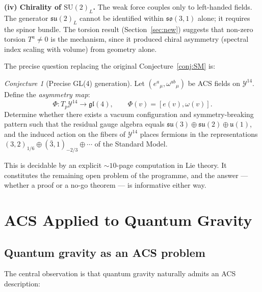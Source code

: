 \documentclass[12pt,a4paper]{article}
\theoremstyle{plain}
\theoremstyle{definition}
\theoremstyle{remark}
\newtheorem{conjecture}[theorem]{Conjecture}
\begin{document}
\medskip
\noindent\textbf{(iv) Chirality of $\mathrm{SU}(2)_L$.}  
The weak force couples only to left-handed fields.  
The generator $\mathfrak{su}(2)_L$ cannot be identified within $\mathfrak{so}(3,1)$ 
alone; it requires the spinor bundle.  
The torsion result (Section~\ref{sec:new}) suggests that 
non-zero torsion $T^a \neq 0$ is the mechanism, 
since it produced chiral asymmetry (spectral index scaling with volume) 
from geometry alone.

\medskip

The precise question replacing the original Conjecture~\ref{conj:SM} is:

\begin{conjecture}[Precise GL(4) generation]\label{conj:gl4-precise}
Let $(e^a{}_\mu, \omega^{ab}{}_\mu)$ be ACS fields on $\mathcal{Y}^{14}$.  
Define the \emph{asymmetry map}:
\[
  \Phi: T_p\mathcal{Y}^{14} \to \mathfrak{gl}(4), \qquad
  \Phi(v) = [e(v), \omega(v)].
\]
Determine whether there exists a vacuum configuration and symmetry-breaking 
pattern such that the residual gauge algebra equals 
$\mathfrak{su}(3) \oplus \mathfrak{su}(2) \oplus \mathfrak{u}(1)$, 
and the induced action on the fibers of $\mathcal{Y}^{14}$ places fermions in 
the representations $(3,2)_{1/6} \oplus (\bar{3},1)_{-2/3} \oplus \cdots$ 
of the Standard Model.
\end{conjecture}

This is decidable by an explicit $\sim\!10$-page computation in Lie theory.  
It constitutes the remaining open problem of the programme, and the answer --- 
whether a proof or a no-go theorem --- is informative either way.


\section{ACS Applied to Quantum Gravity}
\label{sec:qg}

\subsection{Quantum gravity as an ACS problem}

The central observation is that quantum gravity naturally admits an ACS description:
\end{document}
